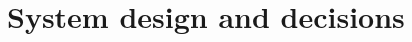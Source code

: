 \documentclass[./memory.tex]{subfiles}
\begin{document}
\chapter{System design and decisions}


\end{document}
